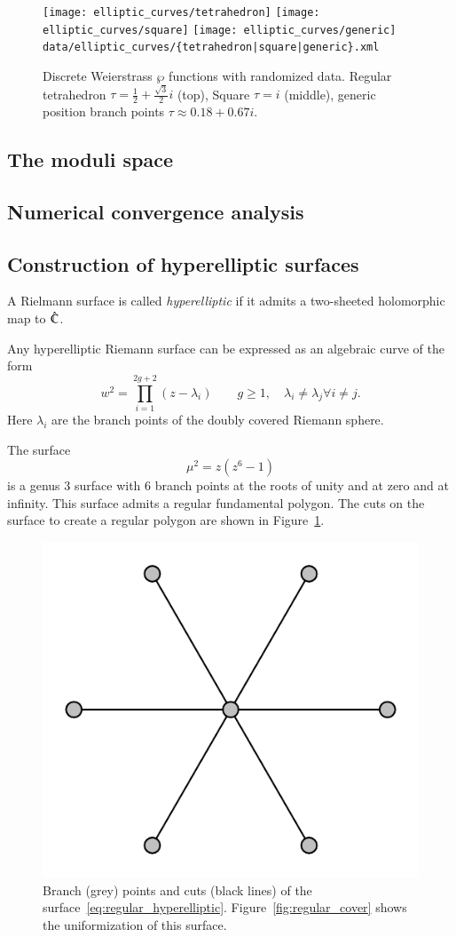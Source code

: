 \documentclass[Thesis.tex]{subfiles}
\begin{document}
\begin{figure}[p]
	\centering
	\texttt{[image: elliptic\_curves/tetrahedron]}
	\texttt{[image: elliptic\_curves/square]}
	\texttt{[image: elliptic\_curves/generic]}
	{\scriptsize\tt data/elliptic\_curves/\{tetrahedron|square|generic\}.xml}
	\caption{Discrete Weierstrass $\wp$ functions with randomized data. Regular tetrahedron $\tau=\frac{1}{2}+\frac{\sqrt 3}{2}i$ (top), Square $\tau=i$ (middle), generic position branch points $\tau \approx 0.18+0.67i$.}
\end{figure}

\subsection{The moduli space}
\subsection{Numerical convergence analysis}

\subsection{Construction of hyperelliptic surfaces}

\begin{definition}
	A Rielmann surface is called \emph{hyperelliptic} if it admits a two-sheeted holomorphic map to
$\hat{\mathbb C}$.
\end{definition}

Any hyperelliptic Riemann surface can be expressed as an algebraic curve of the form
\[ w^2 = \prod_{i=1}^{2g+2}(z-\lambda_i) \quad\quad g\geq1,\quad \lambda_i\neq \lambda_j \forall i\neq j.\]
Here $\lambda_i$ are the branch points of the doubly covered Riemann sphere.

\begin{example}
The surface 
\begin{equation}
	\label{eq:regular_hyperelliptic}
	\mu^2=z(z^6-1)
\end{equation} 
is a genus $3$ surface with $6$ branch points at the 
roots of unity and at zero and at infinity. This surface admits a regular fundamental polygon.
The cuts on the surface to create a regular polygon are shown in Figure~\ref{fig:regular_branchdata}.
\end{example}

\begin{figure}
\centering
\includegraphics[width=0.2\linewidth]{data/hyperelliptic_g3/curve}
\caption{Branch (grey) points and cuts (black lines) of the surface~\ref{eq:regular_hyperelliptic}.
Figure~\ref{fig:regular_cover} shows the uniformization of this surface.}
\label{fig:regular_branchdata}
\end{figure}
\end{document}
